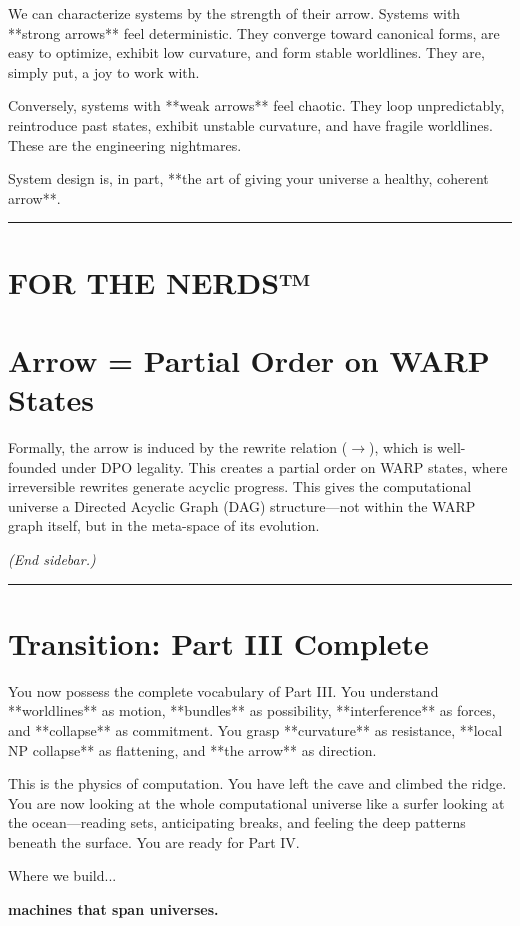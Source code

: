 We can characterize systems by the strength of their arrow. Systems with **strong arrows** feel deterministic. They converge toward canonical forms, are easy to optimize, exhibit low curvature, and form stable worldlines. They are, simply put, a joy to work with.

Conversely, systems with **weak arrows** feel chaotic. They loop unpredictably, reintroduce past states, exhibit unstable curvature, and have fragile worldlines. These are the engineering nightmares.

System design is, in part, **the art of giving your universe a healthy, coherent arrow**.

\begin{center}\rule{0.5\linewidth}{0.5pt}\end{center}

\section*{\texorpdfstring{\textbf{FOR THE NERDS™}}{FOR THE NERDS™}}

\section{\texorpdfstring{\textbf{Arrow = Partial Order on WARP States}}{Arrow = Partial Order on WARP States}}

Formally, the arrow is induced by the rewrite relation ($\rightarrow$), which is well-founded under DPO legality. This creates a partial order on WARP states, where irreversible rewrites generate acyclic progress. This gives the computational universe a Directed Acyclic Graph (DAG) structure—not within the WARP graph itself, but in the meta-space of its evolution.

\emph{(End sidebar.)}

\begin{center}\rule{0.5\linewidth}{0.5pt}\end{center}

\section{\texorpdfstring{\textbf{Transition: Part III Complete}}{14.10 --- Transition: Part III Complete}}

You now possess the complete vocabulary of Part III. You understand **worldlines** as motion, **bundles** as possibility, **interference** as forces, and **collapse** as commitment. You grasp **curvature** as resistance, **local NP collapse** as flattening, and **the arrow** as direction.

This is the physics of computation. You have left the cave and climbed the ridge. You are now looking at the whole computational universe like a surfer looking at the ocean—reading sets, anticipating breaks, and feeling the deep patterns beneath the surface. You are ready for Part IV.

Where we build...

\textbf{machines that span universes.}
